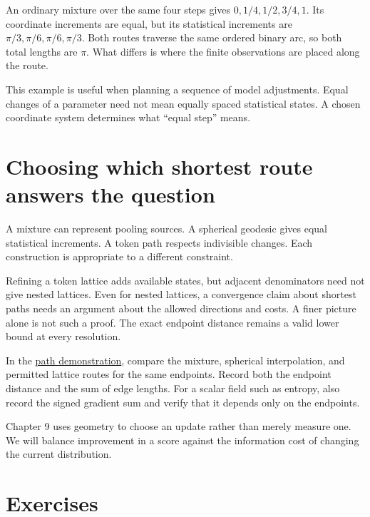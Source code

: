\documentclass[11pt,oneside,openany]{book}
\theoremstyle{definition}
\theoremstyle{remark}
\numberwithin{equation}{chapter}
\begin{document}
An ordinary mixture over the same four steps gives \(0,1/4,1/2,3/4,1\). Its coordinate increments are equal, but its statistical increments are \(\pi/3,\pi/6,\pi/6,\pi/3\). Both routes traverse the same ordered binary arc, so both total lengths are \(\pi\). What differs is where the finite observations are placed along the route.

This example is useful when planning a sequence of model adjustments. Equal changes of a parameter need not mean equally spaced statistical states. A chosen coordinate system determines what ``equal step'' means.

\section{Choosing which shortest route answers the question}\label{ch08-choosing-which-shortest-route-answers-the-question}

A mixture can represent pooling sources. A spherical geodesic gives equal statistical increments. A token path respects indivisible changes. Each construction is appropriate to a different constraint.

Refining a token lattice adds available states, but adjacent denominators need not give nested lattices. Even for nested lattices, a convergence claim about shortest paths needs an argument about the allowed directions and costs. A finer picture alone is not such a proof. The exact endpoint distance remains a valid lower bound at every resolution.

In the \href{https://bobovski66.github.io/IntroDiscreteInfoGeom/demos/week08.html}{path demonstration}, compare the mixture, spherical interpolation, and permitted lattice routes for the same endpoints. Record both the endpoint distance and the sum of edge lengths. For a scalar field such as entropy, also record the signed gradient sum and verify that it depends only on the endpoints.

Chapter 9 uses geometry to choose an update rather than merely measure one. We will balance improvement in a score against the information cost of changing the current distribution.

\section{Exercises}\label{ch08-exercises}
\end{document}
